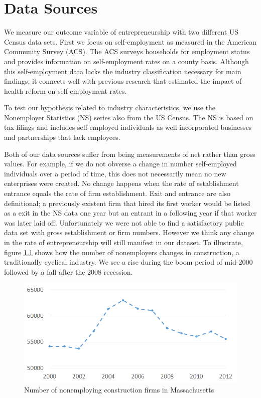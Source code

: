 \chapter{Data Sources}
\label{sec:data}


We measure our outcome variable of entrepreneurship with two different US Census data sets. First we focus on self-employment as measured in the American Community Survey (ACS). The ACS surveys households for employment status and provides information on self-employment rates on a county basis. Although this self-employment data lacks the industry classification necessary for main findings, it connects well with previous research that estimated the impact of health reform on self-employment rates. 

To test our hypothesis related to industry characteristics, we use the Nonemployer Statistics (NS) series also from the US Census. The NS is based on tax filings and includes self-employed individuals as well incorporated businesses and partnerships that lack employees. 

Both of our data sources suffer from being measurements of net rather than gross values. For example, if  we do not obverse a change in number self-employed individuals over a period of time, this does not necessarily mean no new enterprises were created. No change happens when the rate of establishment entrance equals the rate of firm establishment. Exit and entrance are also definitional; a previously existent firm that hired its first worker would be listed as a exit in the NS data one year but an entrant in a following year if that worker was later laid off. Unfortunately we were not able to find a satisfactory public data set with gross establishment or firm numbers. However we think any change in the rate of entrepreneurship will still manifest in our dataset. To illustrate, figure \ref{fig:construct} shows how the number of nonemployers changes in construction, a traditionally cyclical industry. We see a rise during the boom period of mid-2000 followed by a fall after the 2008 recession. 

\begin{figure}[h]
	\centering
	\includegraphics[scale=0.6]{resources/construction.png}
	\caption{Number of nonemploying construction firms in Massachusetts}
	\label{fig:construct}
\end{figure}

